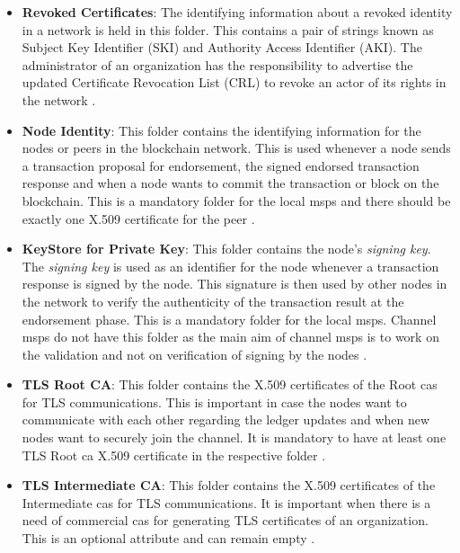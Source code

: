 \documentclass[
  a4paper,  %
  twoside,  %
  bibliography=totoc,
  headsepline,
  cleardoublepage=empty,
  parskip=half,
  draft=false
]{scrbook}
\begin{document}
\begin{itemize}
  \item \textbf{Revoked Certificates}: The identifying information about a revoked identity in a network is held in this folder. This contains a pair of strings known as Subject Key Identifier (SKI) and Authority Access Identifier (AKI). The administrator of an organization has the responsibility to advertise the updated Certificate Revocation List (CRL) to revoke an actor of its rights in the network \cite{Membership}.
  \item \textbf{Node Identity}: This folder contains the identifying information for the nodes or peers in the blockchain network. This is used whenever a node sends a transaction proposal for endorsement, the signed endorsed transaction response and when a node wants to commit the transaction or block on the blockchain. This is a mandatory folder for the local \glspl{msp} and there should be exactly one X.509 certificate for the peer \cite{Membership}.
  \item \textbf{KeyStore for Private Key}: This folder contains the node's \textit{signing key}. The \textit{signing key} is used as an identifier for the node whenever a transaction response is signed by the node. This signature is then used by other nodes in the network to verify the authenticity of the transaction result at the endorsement phase. This is a mandatory folder for the local \glspl{msp}. Channel \glspl{msp} do not have this folder as the main aim of channel \glspl{msp} is to work on the validation and not on verification of signing by the nodes \cite{Membership}.
  \item \textbf{TLS Root CA}: This folder contains the X.509 certificates of the Root \glspl{ca} for TLS communications. This is important in case the nodes want to communicate with each other regarding the ledger updates and when new nodes want to securely join the channel. It is mandatory to have at least one TLS Root \gls{ca} X.509 certificate in the respective folder \cite{Membership}.
  \item \textbf{TLS Intermediate CA}: This folder contains the X.509 certificates of the Intermediate \glspl{ca} for TLS communications. It is important when there is a need of commercial \glspl{ca} for generating TLS certificates of an organization. This is an optional attribute and can remain empty \cite{Membership}.
\end{itemize}
\end{document}
